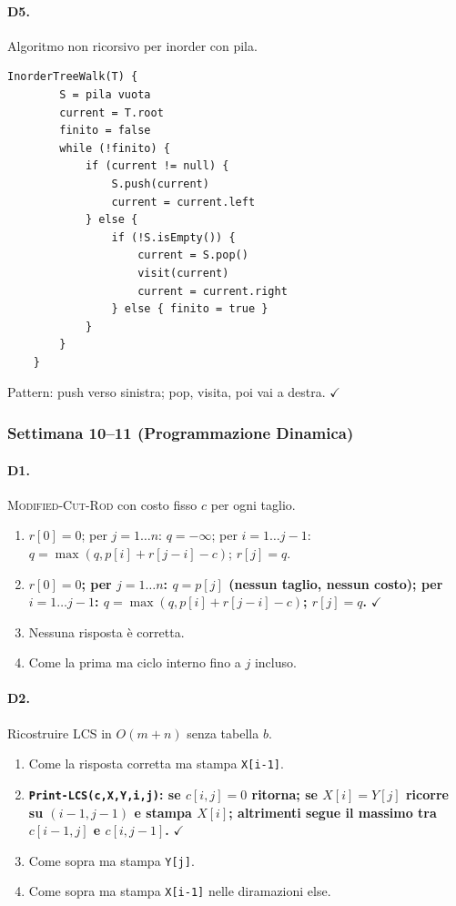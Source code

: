\paragraph{D5.} Algoritmo non ricorsivo per inorder con pila.

\begin{lstlisting}[language={}, numbers=none, frame=none,
	backgroundcolor=\color{white}, basicstyle=\ttfamily\footnotesize]
	InorderTreeWalk(T) {
		S = pila vuota
		current = T.root
		finito = false
		while (!finito) {
			if (current != null) {
				S.push(current)
				current = current.left
			} else {
				if (!S.isEmpty()) {
					current = S.pop()
					visit(current)
					current = current.right
				} else { finito = true }
			}
		}
	}
\end{lstlisting}
\textcolor{correctgreen}{Pattern: push verso sinistra; pop, visita, poi vai a destra.} \hfill\textcolor{correctgreen}{$\checkmark$}

\subsubsection{Settimana 10--11 (Programmazione Dinamica)}

\paragraph{D1.} \textsc{Modified-Cut-Rod} con costo fisso $c$ per ogni taglio.
\begin{enumerate}[label=\Alph*.,leftmargin=*]
	\item $r[0]=0$; per $j=1\ldots n$: $q=-\infty$; per $i=1\ldots j-1$: $q=\max(q,p[i]+r[j-i]-c)$; $r[j]=q$.
	\item \textcolor{correctgreen}{\textbf{$r[0]=0$; per $j=1\ldots n$: $q=p[j]$ (nessun taglio, nessun costo); per $i=1\ldots j-1$: $q=\max(q,p[i]+r[j-i]-c)$; $r[j]=q$.}} \hfill\textcolor{correctgreen}{$\checkmark$}
	\item Nessuna risposta \`e corretta.
	\item Come la prima ma ciclo interno fino a $j$ incluso.
\end{enumerate}

\paragraph{D2.} Ricostruire LCS in $O(m+n)$ senza tabella $b$.
\begin{enumerate}[label=\Alph*.,leftmargin=*]
	\item Come la risposta corretta ma stampa \texttt{X[i-1]}.
	\item \textcolor{correctgreen}{\textbf{\texttt{Print-LCS(c,X,Y,i,j)}: se $c[i,j]=0$ ritorna; se $X[i]=Y[j]$ ricorre su $(i-1,j-1)$ e stampa $X[i]$; altrimenti segue il massimo tra $c[i-1,j]$ e $c[i,j-1]$.}} \hfill\textcolor{correctgreen}{$\checkmark$}
	\item Come sopra ma stampa \texttt{Y[j]}.
	\item Come sopra ma stampa \texttt{X[i-1]} nelle diramazioni else.
\end{enumerate}

